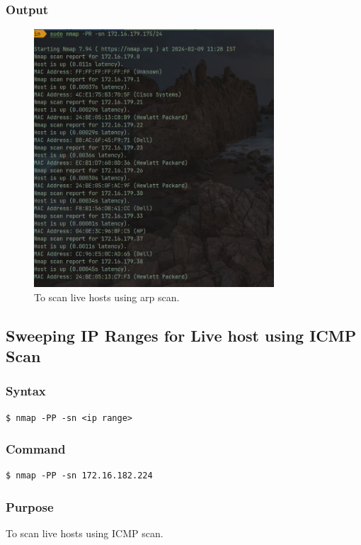 \documentclass[11pt]{article}
\begin{document}
\subsubsection*{Output}
\begin{figure}[H]
    \centering
    \includegraphics[width=0.8\textwidth]{arp scan.png}
    \caption{To scan live hosts using arp scan.}
    \label{fig:1}
\end{figure}


\subsection{Sweeping IP Ranges for Live host using ICMP Scan}

\subsubsection{Syntax}
\begin{verbatim}
$ nmap -PP -sn <ip range>
\end{verbatim}

\subsubsection*{Command}
\begin{verbatim}
$ nmap -PP -sn 172.16.182.224
\end{verbatim}

\subsubsection*{Purpose}
To scan live hosts using ICMP scan.
\end{document}
